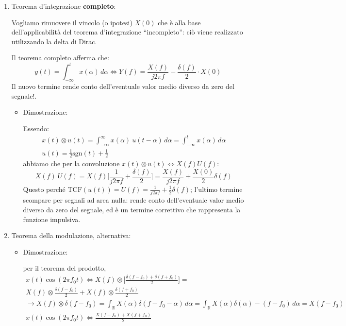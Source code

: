 \documentclass[
]{article}
\begin{document}
\begin{enumerate}
\def\labelenumi{\arabic{enumi}.}
\setcounter{enumi}{21}
\item
  Teorema d'integrazione \textbf{completo}:

  Vogliamo rimuovere il vincolo (o ipotesi) \(X(0)\) che è alla base
  dell'applicabilità del teorema d'integrazione ``incompleto'': ciò
  viene realizzato utilizzando la delta di Dirac.

  Il teorema completo afferma che: \[
  y(t) = \int_{-\infty}^{t} x(\alpha)\,d\alpha \Longleftrightarrow Y(f) = \frac{X(f)}{j2\pi f} + \frac{\delta(f)}{2}\cdot X(0)  
  \] Il nuovo termine rende conto dell'eventuale valor medio diverso da
  zero del segnale!.

  \begin{itemize}
  \item
    Dimostrazione:

    Essendo: \begin{gather*}
      x(t)\otimes u(t) = \int_{-\infty}^{\infty} x(\alpha) \ u(t-\alpha)\,d\alpha = \int_{-\infty}^{t} x(\alpha)\,d\alpha
      \\
      u(t) = \frac{1}{2}\text{sgn}(t)+\frac{1}{2}
      \end{gather*} abbiamo che per la convoluzione
    \(x(t)\otimes u(t)\Longleftrightarrow X(f)U(f)\): \[
      X(f)\ U(f)=X(f)\Big[\frac{1}{j2\pi f}+\frac{\delta(f)}{2}\Big] = \frac{X(f)}{j2\pi f}+ \frac{X(0)}{2}\delta(f)
      \] Questo perché
    \(\text{TCF}(u(t))=U(f)=\frac{1}{j2\pi f}+\frac{1}{2}\delta (f)\);
    l'ultimo termine scompare per segnali ad area nulla: rende conto
    dell'eventuale valor medio diverso da zero del segnale, ed è un
    termine correttivo che rappresenta la funzione impulsiva.
  \end{itemize}
\item
  Teorema della modulazione, alternativa:

  \begin{itemize}
  \item
    Dimostrazione:

    per il teorema del prodotto, \begin{gather*}
      x(t)\cos(2\pi f_{0}t) \Longleftrightarrow X(f) \otimes \Big[ \frac{\delta(f-f_0)+\delta(f+f_0)}{2} \Big] = \\ X(f) \otimes \frac{\delta(f-f_0)}{2} + X(f) \otimes  \frac{\delta(f+f_0)}{2} \\
      \to X(f)\otimes \delta(f-f_0) = \int_{\mathbb{R}}X(\alpha) \delta(f-f_0 -\alpha)\,d\alpha = \int_{\mathbb{R}}X(\alpha) \delta(\alpha) -(f-f_0)\,d\alpha = X(f-f_0) \\
      x(t)\cos(2\pi f_0 t) \Longleftrightarrow \frac{X(f-f_0)+X(f+f_0)}{2}
      \end{gather*}
  \end{itemize}
\end{enumerate}
\end{document}
